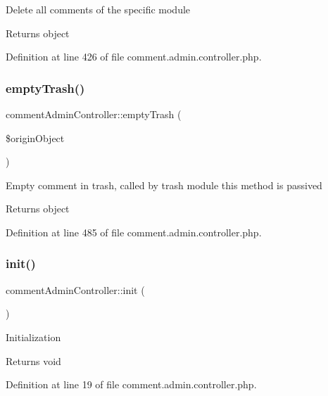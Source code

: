 Delete all comments of the specific module \begin{DoxyReturn}{Returns}
object 
\end{DoxyReturn}


Definition at line 426 of file comment.\+admin.\+controller.\+php.

\mbox{\label{classcommentAdminController_a2b58a744dab20359d036052d505dbb49}} 
\subsubsection{\texorpdfstring{empty\+Trash()}{emptyTrash()}}
{\footnotesize\ttfamily comment\+Admin\+Controller\+::empty\+Trash (\begin{DoxyParamCaption}\item[{}]{\$origin\+Object }\end{DoxyParamCaption})}

Empty comment in trash, called by trash module this method is passived \begin{DoxyReturn}{Returns}
object 
\end{DoxyReturn}


Definition at line 485 of file comment.\+admin.\+controller.\+php.

\mbox{\label{classcommentAdminController_abf17eb18137aa56c78b455fdd2b71b1f}} 
\subsubsection{\texorpdfstring{init()}{init()}}
{\footnotesize\ttfamily comment\+Admin\+Controller\+::init (\begin{DoxyParamCaption}{ }\end{DoxyParamCaption})}

Initialization \begin{DoxyReturn}{Returns}
void 
\end{DoxyReturn}


Definition at line 19 of file comment.\+admin.\+controller.\+php.

\mbox{\label{classcommentAdminController_adea631f91fd944326a1363dbff258d2f}} 

